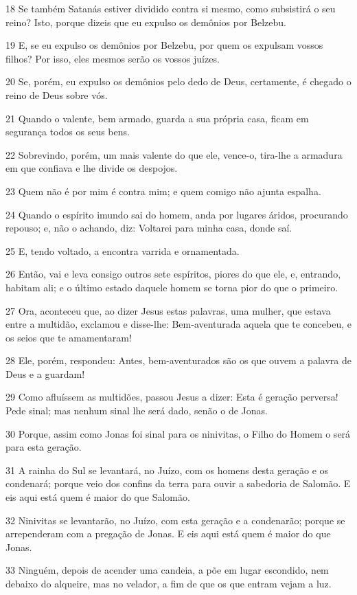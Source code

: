 \par 18 Se também Satanás estiver dividido contra si mesmo, como subsistirá o seu reino? Isto, porque dizeis que eu expulso os demônios por Belzebu.
\par 19 E, se eu expulso os demônios por Belzebu, por quem os expulsam vossos filhos? Por isso, eles mesmos serão os vossos juízes.
\par 20 Se, porém, eu expulso os demônios pelo dedo de Deus, certamente, é chegado o reino de Deus sobre vós.
\par 21 Quando o valente, bem armado, guarda a sua própria casa, ficam em segurança todos os seus bens.
\par 22 Sobrevindo, porém, um mais valente do que ele, vence-o, tira-lhe a armadura em que confiava e lhe divide os despojos.
\par 23 Quem não é por mim é contra mim; e quem comigo não ajunta espalha.
\par 24 Quando o espírito imundo sai do homem, anda por lugares áridos, procurando repouso; e, não o achando, diz: Voltarei para minha casa, donde saí.
\par 25 E, tendo voltado, a encontra varrida e ornamentada.
\par 26 Então, vai e leva consigo outros sete espíritos, piores do que ele, e, entrando, habitam ali; e o último estado daquele homem se torna pior do que o primeiro.
\par 27 Ora, aconteceu que, ao dizer Jesus estas palavras, uma mulher, que estava entre a multidão, exclamou e disse-lhe: Bem-aventurada aquela que te concebeu, e os seios que te amamentaram!
\par 28 Ele, porém, respondeu: Antes, bem-aventurados são os que ouvem a palavra de Deus e a guardam!
\par 29 Como afluíssem as multidões, passou Jesus a dizer: Esta é geração perversa! Pede sinal; mas nenhum sinal lhe será dado, senão o de Jonas.
\par 30 Porque, assim como Jonas foi sinal para os ninivitas, o Filho do Homem o será para esta geração.
\par 31 A rainha do Sul se levantará, no Juízo, com os homens desta geração e os condenará; porque veio dos confins da terra para ouvir a sabedoria de Salomão. E eis aqui está quem é maior do que Salomão.
\par 32 Ninivitas se levantarão, no Juízo, com esta geração e a condenarão; porque se arrependeram com a pregação de Jonas. E eis aqui está quem é maior do que Jonas.
\par 33 Ninguém, depois de acender uma candeia, a põe em lugar escondido, nem debaixo do alqueire, mas no velador, a fim de que os que entram vejam a luz.

